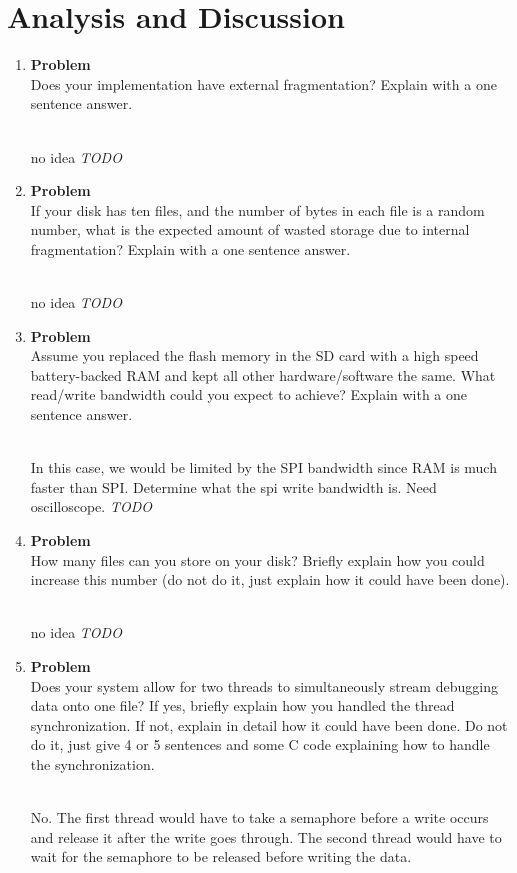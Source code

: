 \documentclass[12pt]{article}
\newenvironment{Ex}{\textbf{Problem}\vspace{.25em}\\}{}
\newcommand{\todo}{\hfill{\LARGE \emph{\color{red}TODO}}}
\newcommand{\hbr}{\hfill\vspace{.25em}\\}
\begin{document}
\section{Analysis and Discussion}
\begin{enumerate}
\item
  \begin{Ex}
    Does your implementation have external fragmentation? Explain with
    a one sentence answer.
    \begin{solution} \hbr
      no idea
      \todo
    \end{solution}
  \end{Ex}
\item
  \begin{Ex}
    If your disk has ten files, and the number of bytes in each file
    is a random number, what is the expected amount of wasted storage
    due to internal fragmentation? Explain with a one sentence answer.
    \begin{solution} \hbr
      no idea
      \todo
    \end{solution}
  \end{Ex}
\item
  \begin{Ex}
    Assume you replaced the flash memory in the SD card with a high
    speed battery-backed RAM and kept all other hardware/software the
    same. What read/write bandwidth could you expect to achieve?
    Explain with a one sentence answer.
    \begin{solution} \hbr
    In this case, we would be limited by the SPI bandwidth since RAM
    is much faster than SPI. Determine what the spi write
    bandwidth is. Need oscilloscope.
    \todo
    \end{solution}
  \end{Ex}
\item
  \begin{Ex}
    How many files can you store on your disk? Briefly explain how you
    could increase this number (do not do it, just explain how it
    could have been done).
    \begin{solution} \hbr
      no idea
      \todo
    \end{solution}
  \end{Ex}
\item
  \begin{Ex}
    Does your system allow for two threads to simultaneously stream
    debugging data onto one file? If yes, briefly explain how you
    handled the thread synchronization. If not, explain in detail how
    it could have been done. Do not do it, just give 4 or 5 sentences
    and some C code explaining how to handle the synchronization.
    \begin{solution} \hbr
    No. The first thread would have to take a semaphore before a write
    occurs and release it after the write goes through. The second
    thread would have to wait for the semaphore to be released before
    writing the data.
    \end{solution}
  \end{Ex}
\end{enumerate}
\end{document}
